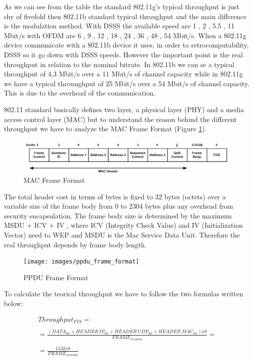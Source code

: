 	As we can see from the table the standard 802.11g's typical throughput is just shy of fivefold then 802.11b standard typical throughput and the main difference is the modulation method.
	With DSSS the available speed are 1 , 2 , 5.5 , 11 Mbit/s with OFDM are 6 , 9 , 12 , 18 , 24 , 36 , 48 , 54 Mbit/s. When a 802.11g device communicate with a 802.11b device it uses, in order to retrocomputability, DSSS  so it go down with DSSS speeds.
	However the important point is the real throughput in relation to the nominal bitrate.
	In 802.11b we can se a typical throughput of 4,3 Mbit/s over a 11 Mbit/s of channel capacity while in 802.11g we have a typical throuughput of 25 Mbit/s over a 54 Mbit/s of channel capacity. This is due to the overhead of the communication.
	
	802.11 standard basically defines two layer, a physical layer (PHY) and a media access control layer (MAC) but to understand the reason behind the different throughput we have to analyze the MAC Frame Format (Figure \ref{mac_packet}).
	
	\begin{figure}[h!]
		\includegraphics[angle=0, keepaspectratio=true, width=15cm]{images/mac_header2}
		\caption{MAC Frame Format}
		\label{mac_packet}
	\end{figure}
	
	The total header cost in terms of bytes is fixed to 32 bytes (octets) over a variable size of the frame body from 0 to 2304 bytes plus any overhead from security encapsulation. The frame body size is determined by the maximum MSDU + ICV + IV , where ICV (Integrity Check Value) and IV (Initialization Vector) need to WEP and MSDU is the Mac Service Data Unit. Therefore the real throughput depends by frame body length.\\
	
	\begin{figure}[h!]
		\texttt{[image: images/ppdu\_frame\_format]}
		\caption{PPDU Frame Format}
		\label{ppdu_frame_packet}
	\end{figure}
	
	To calculate the teorical throughput we have to follow the two formulas written below:
	
	\begin{gather*}
		Throughput_{FIS} = \\\\
		= \frac{ ( DATA_{bit} + HEADER\ IP_{bit} + HEADER\ UDP_{bit} + HEADER\ MAC_{bit} ) x 8 }{ FRAME_{seconds} } = \\\\
		= \frac{ 1532 x 8 }{  FRAME_{seconds} } \\\\
	\end{gather*}
	
